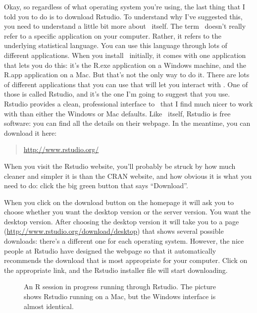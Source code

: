 Okay, so regardless of what operating system you're using, the last thing that I told you to do is to download Rstudio. To understand why I've suggested this,  you need to understand a little bit more about \R\ itself. The term \R\ doesn't really refer to a specific application on your computer. Rather, it refers to the underlying statistical language. You can use this language through lots of different applications. When you install \R\ initially, it comes with one application that lets you do this: it's the R.exe application on a Windows machine, and the R.app application on a Mac. But that's not the only way to do it. There are lots of different applications that you can use that will let you interact with \R. One of those is called Rstudio, and it's the one I'm going to suggest that you use. Rstudio provides a clean, professional interface to \R\ that I find much nicer to work with than either the Windows or Mac defaults. Like \R\ itself, Rstudio is free software: you can find all the details on their webpage. In the meantime, you can download it here:
\begin{quote}
\url{http://www.rstudio.org/}
\end{quote}
When you visit the Rstudio website, you'll probably be struck by how much cleaner and simpler it is than the CRAN website, and how obvious it is what you need to do: click the big green button that says ``Download''.  

When you click on the download button on the homepage it will ask you to choose whether you want  the desktop version or the server version. You want the desktop version. After choosing the desktop version it will take you to a page (\url{http://www.rstudio.org/download/desktop}) that shows several possible downloads: there's a different one for each operating system. However, the nice people at Rstudio have designed the webpage so that it automatically recommends the download that is most appropriate for your computer. Click on the appropriate link, and the Rstudio installer file will start downloading. 

\begin{figure}[t]
\begin{center}
\caption{An R session in progress running through Rstudio. The picture shows Rstudio running on a Mac, but the Windows interface is almost identical.}
\label{fig:rstudio}
\HR
\end{center}
\end{figure}

